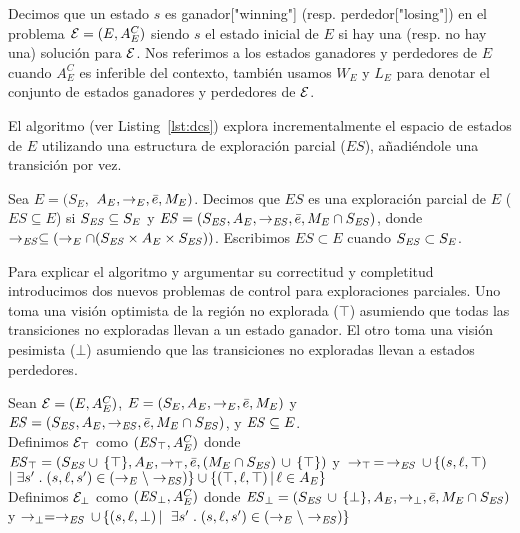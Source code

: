 \begin{notation}
Decimos que un estado $s$ es ganador["winning"] (resp. perdedor["losing"]) en el problema $\mathcal{E} = 
(E, A_E^C)$ siendo $s$ el estado inicial de $E$ si hay una (resp. no hay una) solución para $\mathcal{E}$. Nos referimos a los estados ganadores y perdedores de $E$ cuando $A_E^C$ es inferible del contexto, también usamos $W_E$ y $L_E$ para denotar el conjunto de estados ganadores y perdedores de $\mathcal{E}$.
\end{notation}

El algoritmo (ver Listing~\ref{lst:dcs}) explora incrementalmente el espacio de estados de $E$ utilizando una estructura de exploración parcial ($ES$), añadiéndole una transición por vez.


\begin{definition}
 \label{def:unexploredTo}
Sea $E = (S_E,$ $A_E, \rightarrow_E, \bar{e}, M_E)$. Decimos que $ES$ es una exploración parcial de $E$ ($ES \subseteq E$) si $S_{\mathit{ES}} \subseteq 
S_E$ y $\mathit{ES} = (S_{\mathit{ES}},A_E, \rightarrow_{\mathit{ES}},\bar{e},M_E 
\cap S_{\mathit{ES}})$, donde $ \rightarrow_{\mathit{ES}} \subseteq (\rightarrow_E \cap 
(S_{\mathit{ES}} \times A_E \times S_{\mathit{ES}}))$. Escribimos $ES \subset E$ cuando $S_{\mathit{ES}} \subset S_E$.
\end{definition}

Para explicar el algoritmo y argumentar su correctitud y completitud introducimos dos nuevos problemas de control para exploraciones parciales. Uno toma una visión optimista de la región no explorada ($\top$) asumiendo que todas las transiciones no exploradas llevan a un estado ganador. El otro toma una visión pesimista ($\bot$) asumiendo que las transiciones no exploradas llevan a estados perdedores.

\begin{definition}
 \label{def:unexploredTo}

Sean $\mathcal{E} = (E, A_E^C)$, $E = (S_E,A_E,\rightarrow_E,\bar{e},M_E)$ y $\mathit{ES} = 
(S_{\mathit{ES}},A_E, \rightarrow_{\mathit{ES}},\bar{e},M_E \cap S_{\mathit{ES}})$, y $\mathit{ES} 
\subseteq E$.
\\
Definimos $\mathcal{E}_\top$ como $(\mathit{\mathit{ES}_{\top}}, A_E^C)$ donde 
$\mathit{\mathit{ES}_{\top}} = (S_{\mathit{ES}} \cup \, \{\top\},A_E,\rightarrow_\top, 
\bar{e}, 
(M_E \cap S_{\mathit{ES}})\, \cup \, \{\top\})$ y $\, \rightarrow_\top \, = \, \rightarrow_{\mathit{ES}} 
\, 
\cup\, \{(s,\ell, \top) 
\;$ $ | \; \exists s' \;.\; (s, \ell, s') \in (\rightarrow_E \setminus \rightarrow_{\mathit{ES}})\} \cup \{(\top, \ell, \top) \, | \, \ell \in A_E\}$ \\
Definimos $\mathcal{E}_\bot$ como $(\mathit{\mathit{ES}_{\bot}}, A_E^C)$ donde 
$\mathit{\mathit{ES}_{\bot}} = (S_{\mathit{ES}} \, \cup \, 
\{\bot\},A_E,\rightarrow_\bot, 
\bar{e}, M_E \cap S_{\mathit{ES}})$ y $\rightarrow_\bot = \rightarrow_{\mathit{ES}} \, \cup \, \{(s,\ell, 
\bot) \, | \, $ $ \exists s' \;.\; (s, \ell, s') \in (\rightarrow_E \setminus \rightarrow_{\mathit{ES}})\}$ 
\end{definition}

